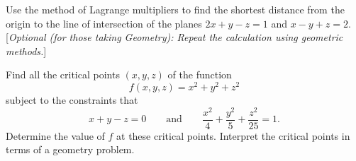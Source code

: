 \documentclass[answers]{exam}
\begin{document}
\begin{questions}



\question%
Use the method of Lagrange multipliers to find the shortest distance from the origin to the line of intersection of the planes $2 x+y-z=1$ and $x-y+z=2$. [\emph{Optional (for those taking Geometry): Repeat the calculation using geometric methods.}]



\question%
Find all the critical points $(x, y, z)$ of the function \[
	f(x, y, z)=x^{2}+y^{2}+z^{2}
\] subject to the constraints that \[
	x+y-z=0\qquad
	\text{and}\qquad
	\frac{x^{2}}{4}+\frac{y^{2}}{5}+\frac{z^{2}}{25}=1 .
\] Determine the value of $f$ at these critical points. Interpret the critical points in terms of a geometry problem.

\end{questions}
\end{document}
